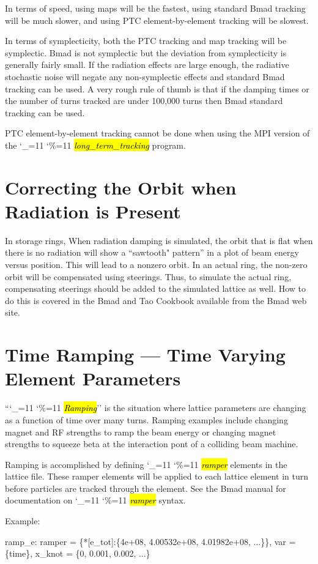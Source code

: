 \documentclass{hitec}
\newcommand\dottcmd[1]{\hl{\em#1}\endgroup}
\newcommand{\vn}{\begingroup\catcode`\_=11 \catcode`\%=11 \dottcmd}
\newcommand{\ltt}{\vn{long_term_tracking}\xspace}
\newcommand{\Section}[1]{\section{#1}\vspace*{-1ex}}
\begin{document}
{{{{{{{{{{{{In terms of speed, using maps will be the fastest, using standard Bmad tracking will be much
slower, and using PTC element-by-element tracking will be slowest.

In terms of symplecticity, both the PTC tracking and map tracking will be symplectic.
Bmad is not symplectic but the deviation from symplecticity is generally fairly small. If the
radiation effects are large enough, the radiative stochastic noise will negate any non-symplectic
effects and standard Bmad tracking can be used. A very rough rule of thumb is that if the damping times
or the number of turns tracked are under 100,000 turns then Bmad standard tracking can be used.

PTC element-by-element tracking cannot be done when using the MPI version of the \ltt program.

\Section{Correcting the Orbit when Radiation is Present}

In storage rings, When radiation damping is simulated, the orbit that is flat when there is no
radiation will show a ``sawtooth" pattern'' in a plot of beam energy versus position. This will lead
to a nonzero orbit. In an actual ring, the non-zero orbit will be compensated using steerings. Thus,
to simulate the actual ring, compensating steerings should be added to the simulated lattice as
well. How to do this is covered in the Bmad and Tao Cookbook available from the Bmad web site.

\Section{Time Ramping --- Time Varying Element Parameters}
\label{s:ramp}

``\vn{Ramping}'' is the situation where lattice parameters are changing as a function of time over
many turns. Ramping examples include changing magnet and RF strengths to ramp the beam energy or
changing magnet strengths to squeeze beta at the interaction pont of a colliding beam machine.

Ramping is accomplished by defining \vn{ramper} elements in the lattice file. These ramper elements
will be applied to each lattice element in turn before particles are tracked through the
element. See the Bmad manual for documentation on \vn{ramper} syntax.

Example:
\begin{code}
  ramp_e: ramper = \{*[e_tot]:\{4e+08, 4.00532e+08, 4.01982e+08, ...\}\},
                var = \{time\}, x_knot = \{0, 0.001, 0.002, ...\}


\end{code}}}}}}}}}}}}}
\end{document}
